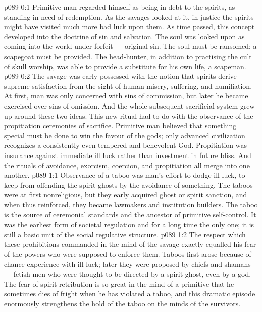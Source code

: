 \author{Brilliant Evening Star}
\vs p089 0:1 Primitive man regarded himself as being in debt to the spirits, as standing in need of redemption. As the savages looked at it, in justice the spirits might have visited much more bad luck upon them. As time passed, this concept developed into the doctrine of sin and salvation. The soul was looked upon as coming into the world under forfeit --- original sin. The soul must be ransomed; a scapegoat must be provided. The head\hyp{}hunter, in addition to practising the cult of skull worship, was able to provide a substitute for his own life, a scapeman.
\vs p089 0:2 The savage was early possessed with the notion that spirits derive supreme satisfaction from the sight of human misery, suffering, and humiliation. At first, man was only concerned with sins of commission, but later he became exercised over sins of omission. And the whole subsequent sacrificial system grew up around these two ideas. This new ritual had to do with the observance of the propitiation ceremonies of sacrifice. Primitive man believed that something special must be done to win the favour of the gods; only advanced civilization recognizes a consistently even\hyp{}tempered and benevolent God. Propitiation was insurance against immediate ill luck rather than investment in future bliss. And the rituals of avoidance, exorcism, coercion, and propitiation all merge into one another.
\vs p089 1:1 Observance of a taboo was man’s effort to dodge ill luck, to keep from offending the spirit ghosts by the avoidance of something. The taboos were at first nonreligious, but they early acquired ghost or spirit sanction, and when thus reinforced, they became lawmakers and institution builders. The taboo is the source of ceremonial standards and the ancestor of primitive self\hyp{}control. It was the earliest form of societal regulation and for a long time the only one; it is still a basic unit of the social regulative structure.
\vs p089 1:2 The respect which these prohibitions commanded in the mind of the savage exactly equalled his fear of the powers who were supposed to enforce them. Taboos first arose because of chance experience with ill luck; later they were proposed by chiefs and shamans --- fetish men who were thought to be directed by a spirit ghost, even by a god. The fear of spirit retribution is so great in the mind of a primitive that he sometimes dies of fright when he has violated a taboo, and this dramatic episode enormously strengthens the hold of the taboo on the minds of the survivors.
